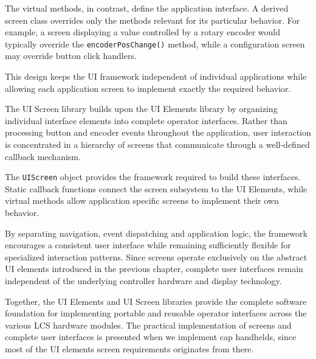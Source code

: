 The virtual methods, in contrast, define the application interface. A derived
screen class overrides only the methods relevant for its particular behavior.
For example, a screen displaying a value controlled by a rotary encoder would
typically override the \texttt{encoderPosChange()} method, while a configuration
screen may override button click handlers.

This design keeps the UI framework independent of individual applications while
allowing each application screen to implement exactly the required behavior.


The UI Screen library builds upon the UI Elements library by organizing
individual interface elements into complete operator interfaces. Rather than
processing button and encoder events throughout the application, user
interaction is concentrated in a hierarchy of screens that communicate through a
well-defined callback mechanism.

The \texttt{UIScreen} object provides the framework required to build these
interfaces. Static callback functions connect the screen subsystem to the UI
Elements, while virtual methods allow application specific screens to implement
their own behavior.

By separating navigation, event dispatching and application logic, the framework
encourages a consistent user interface while remaining sufficiently flexible for
specialized interaction patterns. Since screens operate exclusively on the
abstract UI elements introduced in the previous chapter, complete user
interfaces remain independent of the underlying controller hardware and display
technology.

Together, the UI Elements and UI Screen libraries provide the complete software
foundation for implementing portable and reusable operator interfaces across
the various LCS hardware modules. The practical implementation of screens and
complete user interfaces is presented when we implement cap handhelds, since
most of the UI elements screen requirements originates from there.
